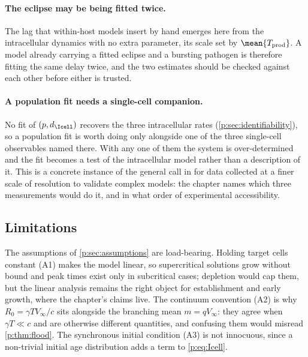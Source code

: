\paragraph{The eclipse may be being fitted twice.} The lag that within-host
models insert by hand emerges here from the intracellular dynamics with no
extra parameter, its scale set by $\mean{T_{\rm prod}}$. A model already
carrying a fitted eclipse and a bursting pathogen is therefore fitting the
same delay twice, and the two estimates should be checked against each other
before either is trusted.

\paragraph{A population fit needs a single-cell companion.} No fit of
$(p,d_{\Icell})$ recovers the three intracellular rates
(\cref{p:sec:identifiability}), so a population fit is worth doing only
alongside one of the three single-cell observables named there. With any one
of them the system is over-determined and the fit becomes a test of the
intracellular model rather than a description of it. This is a concrete
instance of the general call in \cite{ciupe2024incorporating} for data
collected at a finer scale of resolution to validate complex models: the
chapter names which three measurements would do it, and in what order of
experimental accessibility.

\subsection{Limitations}
\label{p:sec:limitations}

The assumptions of \cref{p:sec:assumptions} are load-bearing. Holding target
cells constant (A1) makes the model linear, so supercritical solutions grow
without bound and peak times exist only in subcritical cases; depletion
would cap them, but the linear analysis remains the right object for
establishment and early growth, where the chapter's claims live. The
continuum convention (A2) is why $R_0=\gamma TV_\infty/c$ sits alongside the
branching mean $m=qV_\infty$: they agree when $\gamma T\ll c$ and are
otherwise different quantities, and confusing them would misread
\cref{p:thm:flood}. The synchronous initial condition (A3) is not innocuous,
since a non-trivial initial age distribution adds a term to
\cref{p:eq:Icell}.

